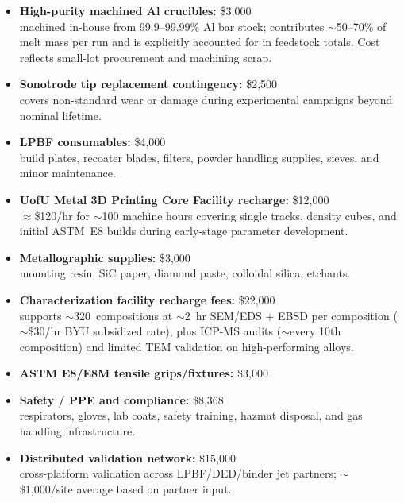 \documentclass[11pt,letterpaper]{article}
\begin{document}
\begin{itemize}
\item \textbf{High-purity machined Al crucibles:} \$3,000 \\
machined in-house from 99.9--99.99\% Al bar stock; contributes
$\sim$50--70\% of melt mass per run and is explicitly accounted
for in feedstock totals. Cost reflects small-lot procurement and
machining scrap.

\item \textbf{Sonotrode tip replacement contingency:} \$2,500 \\
covers non-standard wear or damage during experimental campaigns
beyond nominal lifetime.

\item \textbf{LPBF consumables:} \$4,000 \\
build plates, recoater blades, filters, powder handling supplies,
sieves, and minor maintenance.

\item \textbf{UofU Metal 3D Printing Core Facility recharge:}
\$12,000 \\
$\approx$\$120/hr for $\sim$100 machine hours covering single
tracks, density cubes, and initial ASTM~E8 builds during
early-stage parameter development.

\item \textbf{Metallographic supplies:} \$3,000 \\
mounting resin, SiC paper, diamond paste, colloidal silica,
etchants.

\item \textbf{Characterization facility recharge fees:} \$22,000 \\
supports $\sim$320~compositions at $\sim$2~hr SEM/EDS + EBSD per
composition ($\sim$\$30/hr BYU subsidized rate), plus ICP-MS audits
($\sim$every 10th composition) and limited TEM validation on
high-performing alloys.

\item \textbf{ASTM E8/E8M tensile grips/fixtures:} \$3,000

\item \textbf{Safety / PPE and compliance:} \$8,368 \\
respirators, gloves, lab coats, safety training, hazmat disposal,
and gas handling infrastructure.

\item \textbf{Distributed validation network:} \$15,000 \\
cross-platform validation across LPBF/DED/binder jet partners;
$\sim$\$1,000/site average based on partner input.


\end{itemize}
\end{document}
